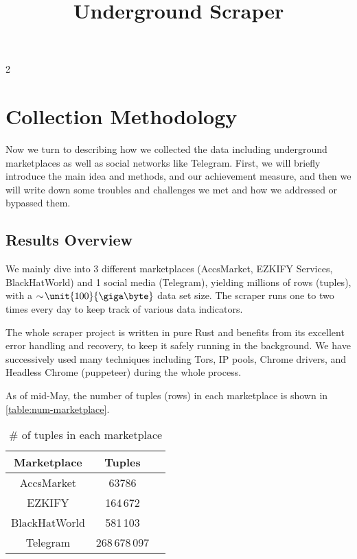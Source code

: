 \documentclass{article}
\title{Underground Scraper}
\begin{document}
	\maketitle
	\addtocounter{section}2
	\section{Collection Methodology}

	Now we turn to describing how we collected the data including underground marketplaces as well as social networks like Telegram.
	First, we will briefly introduce the main idea and methods, and our achievement measure, and then we will write down some troubles and challenges we met and how we addressed or bypassed them.

	\subsection{Results Overview}

	We mainly dive into 3 different marketplaces (AccsMarket, EZKIFY Services, BlackHatWorld) and 1 social media (Telegram), yielding millions of rows (tuples), with a $\sim\!\unit {100} {\giga\byte}$ data set size. The scraper runs one to two times every day to keep track of various data indicators.

	The whole scraper project is written in pure Rust and benefits from its excellent error handling and recovery, to keep it safely running in the background. We have successively used many techniques including Tors\cite{tor}, IP pools, Chrome drivers, and Headless Chrome (puppeteer) during the whole process.

	As of mid-May, the number of tuples (rows) in each marketplace is shown in \autoref{table:num-marketplace}.

	\begin{table}[htb]
		\centering
		\begin{tabular}{|c|c|c|}
			\hline
				Marketplace & Tuples \\
			\hline\hline
				AccsMarket & 63786 \\
			\hline
				EZKIFY & 164\,672 \\
			\hline
				BlackHatWorld & 581\,103 \\
			\hline
				Telegram & 268\,678\,097 \\
			\hline
		\end{tabular}
		\caption{\# of tuples in each marketplace}
		\label{table:num-marketplace}
	\end{table}
\end{document}
